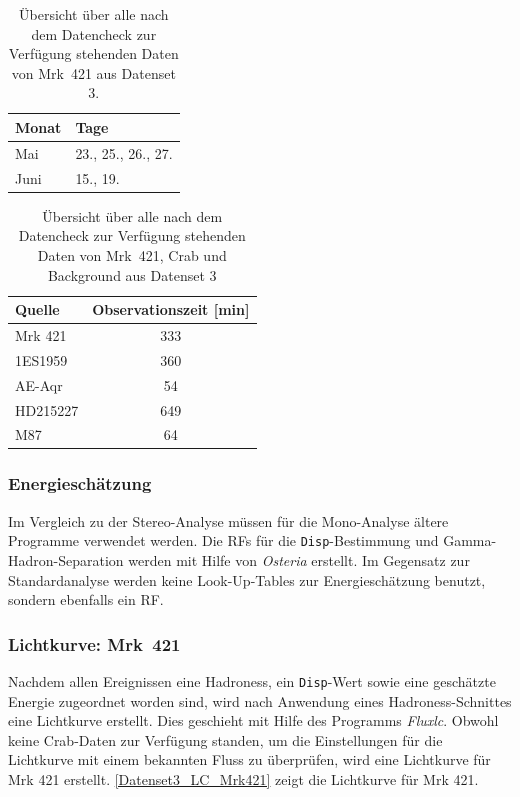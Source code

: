 \begin{table}[!h]
\centering
\caption{Übersicht über alle nach dem Datencheck zur Verfügung stehenden Daten von Mrk~421 aus Datenset 3.}
\label{tab:Datenset3-Mrk421}
\begin{tabular}{ll}
  \toprule
  Monat & Tage\\
  \midrule
  \midrule
Mai & 23., 25., 26., 27.\\
Juni & 15., 19. \\
  \bottomrule
\end{tabular}
\end{table}


\begin{table}[!h]
\centering
\caption{Übersicht über alle nach dem Datencheck zur Verfügung stehenden Daten von Mrk~421, Crab und Background aus Datenset 3}
\label{tab:Datenset3}
\begin{tabular}{lc}
  \toprule
  Quelle & Observationszeit [min]\\
  \midrule
  \midrule
  Mrk 421 & 333\\
  \midrule
  1ES1959 & 360 \\
  AE-Aqr & 54  \\
  HD215227 & 649 \\
  M87 & 64 \\
  \bottomrule
\end{tabular}
\end{table}

\subsubsection{Energieschätzung}
Im Vergleich zu der Stereo-Analyse müssen für die Mono-Analyse ältere Programme verwendet werden.
Die RFs für die \texttt{Disp}-Bestimmung und Gamma-Hadron-Separation werden mit Hilfe von \textit{Osteria} erstellt.
Im Gegensatz zur Standardanalyse werden keine Look-Up-Tables zur Energieschätzung benutzt, sondern ebenfalls ein RF.

\subsubsection{Lichtkurve: Mrk~421}
Nachdem allen Ereignissen eine Hadroness, ein \texttt{Disp}-Wert sowie eine geschätzte Energie zugeordnet worden sind, wird nach Anwendung eines Hadroness-Schnittes eine Lichtkurve erstellt.
Dies geschieht mit Hilfe des Programms \textit{Fluxlc}.
Obwohl keine Crab-Daten zur Verfügung standen, um die Einstellungen für die Lichtkurve mit einem bekannten Fluss zu überprüfen, wird eine Lichtkurve für Mrk 421 erstellt.
\autoref{Datenset3_LC_Mrk421} zeigt die Lichtkurve für Mrk 421.

